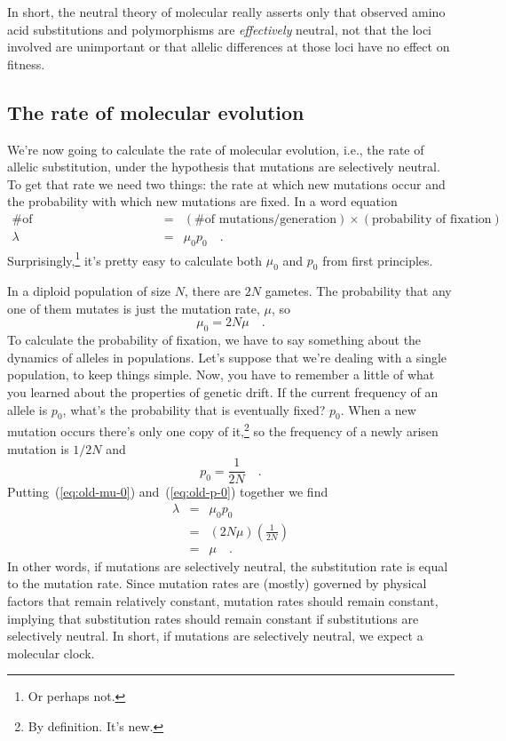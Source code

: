 \noindent In short, the neutral theory of molecular really asserts
only that observed amino acid substitutions and polymorphisms are {\it
effectively\/} neutral, not that the loci involved are unimportant or
that allelic differences at those loci have no effect on
fitness.

\subsection*{The rate of molecular evolution}

We're now going to calculate the rate of molecular evolution, i.e.,
the rate of allelic substitution, under the hypothesis that mutations
are selectively neutral. To get that rate we need two things: the rate
at which new mutations occur and the probability with which new
mutations are fixed. In a word equation
\begin{eqnarray*}
\mbox{\# of substitutions/generation} &=& (\mbox{\# of mutations/generation})\times(\mbox{probability
  of fixation}) \\
\lambda &=& \mu_0p_0 \quad .
\end{eqnarray*}
Surprisingly,\footnote{Or perhaps not.} it's pretty easy to calculate
both $\mu_0$ and $p_0$ from first principles.

In a diploid population of size $N$, there are $2N$ gametes. The
probability that any one of them mutates is just the mutation rate,
$\mu$, so
\begin{equation}
\mu_0 = 2N\mu \quad . \label{eq:old-mu-0}
\end{equation}
To calculate the probability of fixation, we have to say something
about the dynamics of alleles in populations. Let's suppose that we're
dealing with a single population, to keep things simple. Now, you have
to remember a little of what you learned about the properties of
genetic drift. If the current frequency of an allele is $p_0$, what's
the probability that is eventually fixed?  $p_0$. When a new mutation
occurs there's only one copy of it,\footnote{By definition. It's new.}
so the frequency of a newly arisen mutation is $1/2N$ and
\begin{equation}
p_0 = \frac{1}{2N} \quad . \label{eq:old-p-0}
\end{equation}
Putting~(\ref{eq:old-mu-0}) and~(\ref{eq:old-p-0}) together we find
\begin{eqnarray*}
\lambda &=& \mu_0p_0 \\
        &=& (2N\mu)\left(\frac{1}{2N}\right) \\
        &=& \mu \quad .
\end{eqnarray*}
In other words, if mutations are selectively neutral, the substitution
rate is equal to the mutation rate. Since mutation rates are (mostly)
governed by physical factors that remain relatively constant, mutation
rates should remain constant, implying that substitution rates should
remain constant if substitutions are selectively neutral. In short, if
mutations are selectively neutral, we expect a molecular clock.

